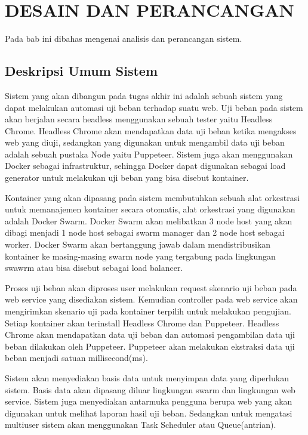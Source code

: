 \chapter{DESAIN DAN PERANCANGAN}
    Pada bab ini dibahas mengenai analisis dan perancangan sistem.
    
    \section{Deskripsi Umum Sistem}
    	\indent Sistem yang akan dibangun pada tugas akhir ini adalah sebuah sistem yang dapat melakukan automasi uji beban terhadap suatu web. Uji beban pada sistem akan berjalan secara headless menggunakan sebuah tester yaitu Headless Chrome. Headless Chrome akan mendapatkan data uji beban ketika mengakses web yang diuji, sedangkan yang digunakan untuk mengambil data uji beban adalah sebuah pustaka Node yaitu Puppeteer. Sistem juga akan menggunakan Docker sebagai infrastruktur, sehingga Docker dapat digunakan sebagai load generator untuk melakukan uji beban yang bisa disebut kontainer.
    	
    	\indent Kontainer yang akan dipasang pada sistem membutuhkan sebuah alat orkestrasi untuk memanajemen kontainer secara otomatis, alat orkestrasi yang digunakan adalah Docker Swarm. Docker Swarm akan melibatkan 3 node host yang akan dibagi menjadi 1 node host sebagai swarm manager dan 2 node host sebagai worker. Docker Swarm akan bertanggung jawab dalam mendistribusikan kontainer ke masing-masing swarm node yang tergabung pada lingkungan swawrm atau bisa disebut sebagai load balancer.
    	
    	\indent Proses uji beban akan diproses user melakukan request skenario uji beban pada web service yang disediakan sistem. Kemudian controller pada web service akan mengirimkan skenario uji pada kontainer terpilih untuk melakukan pengujian. Setiap kontainer akan terinstall Headless Chrome dan Puppeteer. Headless Chrome akan mendapatkan data uji beban dan automasi pengambilan data uji beban dilakukan oleh Puppeteer. Puppeteer akan melakukan ekstraksi data uji beban menjadi satuan millisecond(ms). 
    	
    	\indent Sistem akan menyediakan basis data untuk menyimpan data yang diperlukan sistem. Basis data akan dipasang diluar lingkungan swarm dan lingkungan web service. Sistem juga menyediakan antarmuka pengguna berupa web yang akan digunakan untuk melihat laporan hasil uji beban. Sedangkan untuk mengatasi multiuser sistem akan menggunakan Task Scheduler atau Queue(antrian).
    
